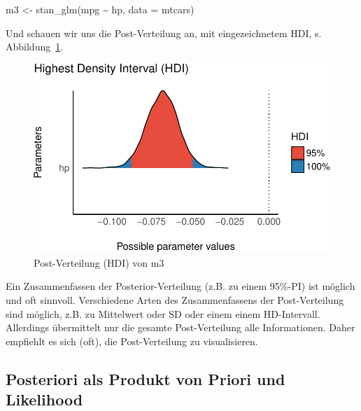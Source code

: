 \documentclass[
  a4paper,
  DIV=11]{scrreprt}
\newenvironment{Shaded}{\begin{snugshade}}{\end{snugshade}}
\newcommand{\AttributeTok}[1]{\textcolor[rgb]{0.40,0.45,0.13}{#1}}
\newcommand{\FunctionTok}[1]{\textcolor[rgb]{0.28,0.35,0.67}{#1}}
\newcommand{\NormalTok}[1]{\textcolor[rgb]{0.00,0.23,0.31}{#1}}
\newcommand{\OtherTok}[1]{\textcolor[rgb]{0.00,0.23,0.31}{#1}}
\newcommand{\SpecialCharTok}[1]{\textcolor[rgb]{0.37,0.37,0.37}{#1}}
\theoremstyle{definition}
\theoremstyle{remark}
\begin{document}
\begin{Shaded}
\begin{Highlighting}[]
\NormalTok{m3 }\OtherTok{\textless{}{-}} \FunctionTok{stan\_glm}\NormalTok{(mpg }\SpecialCharTok{\textasciitilde{}}\NormalTok{ hp, }\AttributeTok{data =}\NormalTok{ mtcars)}
\end{Highlighting}
\end{Shaded}

Und schauen wir uns die Post-Verteilung an, mit eingezeichnetem HDI, s.
Abbildung~\ref{fig-post-m3}.

\begin{figure}

{\centering \includegraphics{./abschluss_files/figure-pdf/fig-post-m3-1.pdf}

}

\caption{\label{fig-post-m3}Post-Verteilung (HDI) von m3}

\end{figure}

Ein Zusammenfassen der Posterior-Verteilung (z.B. zu einem 95\%-PI) ist
möglich und oft sinnvoll. Verschiedene Arten des Zusammenfassens der
Post-Verteilung sind möglich, z.B. zu Mittelwert oder SD oder einem
einem HD-Intervall. Allerdings übermittelt nur die gesamte
Post-Verteilung alle Informationen. Daher empfiehlt es sich (oft), die
Post-Verteilung zu visualisieren.

\hypertarget{posteriori-als-produkt-von-priori-und-likelihood-1}{%
\subsection{Posteriori als Produkt von Priori und
Likelihood}\label{posteriori-als-produkt-von-priori-und-likelihood-1}}
\end{document}
